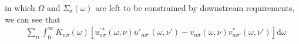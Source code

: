 in which $\Omega$ and $\Sigma_\sigma(\omega)$ are left to be constrained by downstream requirements, we can see that
\begin{equation}
\begin{split}
&\sum_n\int_0^\infty K_{n\sigma}(\omega)\left[u_{n\sigma}^{\prime*}(\omega,\nu)u'_{n\sigma'}(\omega,\nu') - v_{n\sigma}(\omega,\nu)v_{n\sigma'}^*(\omega,\nu')\right]\mathrm{d}\omega\\

\end{split}
\end{equation}
